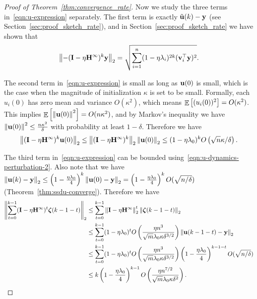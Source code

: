 \begin{proof}[Proof of Theorem~\ref{thm:convergence_rate}]
	Now we study the three terms in~\eqref{eqn:u-expression} separately.
	The first term is exactly $\tilde{\mathbf{u}}(k) - \mathbf{y}$ (see Section~\ref{sec:proof_sketch_rate}), and in Section~\ref{sec:proof_sketch_rate} we have shown that
	\begin{equation} \label{eqn:u-expression-first-term}
	\left\|-(\mathbf{I} - \eta \mathbf{H}^\infty)^k \mathbf{y}\right\|_2 = \sqrt{\sum_{i=1}^n (1-\eta\lambda_i)^{2k} (\mathbf{v}_i^\top \mathbf{y})^2}.
	\end{equation}
	
	The second term in~\eqref{eqn:u-expression} is small as long as $\mathbf{u}(0)$ is small, which is the case when the magnitude of initialization $\kappa$ is set to be small.
	Formally, each $u_i(0)$ has zero mean and variance $O(\kappa^2)$, which means $\mathop\mathbb{E}\left[(u_i(0))^2\right] = O(\kappa^2)$. This implies $\mathop\mathbb{E}\left[\left\|\mathbf{u}(0)\right\|^2\right] = O(n\kappa^2)$, and by Markov's inequality we have $\left\|\mathbf{u}(0)\right\|^2 \le \frac{n\kappa^2}{\delta}$ with probability at least $1-\delta$.
	Therefore we have
	\begin{equation} \label{eqn:u-expression-second-term}
	\left\|(\mathbf{I} - \eta \mathbf{H}^\infty)^k \mathbf{u}(0) \right\|_2
	\le \left\|(\mathbf{I} - \eta \mathbf{H}^\infty)^k \right\|_2 \left\|\mathbf{u}(0)\right\|_2
	\le (1-\eta \lambda_0)^k O\left( \sqrt n \kappa / \delta \right).
	\end{equation} 
	
	The third term in~\eqref{eqn:u-expression} can be bounded using~\eqref{eqn:u-dynamics-perturbation-2}.
	Also note that we have $\left\|\mathbf{u}(k) - \mathbf{y}\right\|_2 \le \left( 1 - \frac{\eta\lambda_0}{4} \right)^k \left\|\mathbf{u}(0) - \mathbf{y}\right\|_2 = \left( 1 - \frac{\eta\lambda_0}{4} \right)^k O(\sqrt{n/\delta})$ (Theorem~\ref{thm:ssdu-converge}).
	Therefore we have
	\begin{equation} \label{eqn:u-expression-third-term}
	\begin{aligned}
	\left\|\sum_{t=0}^{k-1} (\mathbf{I} - \eta \mathbf{H}^\infty)^t \bm{\zeta}(k-1-t)\right\|_2
	&\le \sum_{t=0}^{k-1} \left\| \mathbf{I} - \eta \mathbf{H}^\infty\right\|_2^t \left\|\bm{\zeta}(k-1-t)\right\|_2 \\
	&\le \sum_{t=0}^{k-1} (1-\eta \lambda_0)^t O\left(  \frac{\eta n^3}{\sqrt m \lambda_0 \kappa \delta^{3/2}} \right) \left\|\mathbf{u}(k-1-t) - \mathbf{y}\right\|_2  \\
	&\le \sum_{t=0}^{k-1} (1-\eta \lambda_0)^t O\left(  \frac{\eta n^3}{\sqrt m \lambda_0 \kappa \delta^{3/2}} \right) \left( 1 - \frac{\eta\lambda_0}{4} \right)^{k-1-t} O(\sqrt{n/\delta})  \\
	&\le k \left( 1 - \frac{\eta\lambda_0}{4} \right)^{k-1}   O\left(  \frac{\eta n^{7/2}}{\sqrt m \lambda_0 \kappa \delta^{2}} \right) .
	\end{aligned}
	\end{equation}
	

\end{proof}
